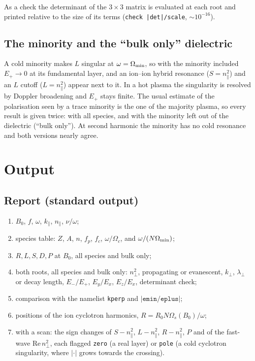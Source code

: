 \documentclass[11pt,a4paper]{article}
\newcommand{\npar}{n_\parallel}
\newcommand{\nperp}{n_\perp}
\newcommand{\code}[1]{\texttt{#1}}
\begin{document}
As a check the determinant of the $3\times3$ matrix is evaluated at each root
and printed relative to the size of its terms (\code{check |det|/scale},
$\sim10^{-16}$).

\subsection{The minority and the ``bulk only'' dielectric}\label{sec:minority}

A cold minority makes $L$ singular at $\omega=\Omega_{\rm min}$, so with the
minority included $E_+\to0$ at its fundamental layer, and an ion--ion hybrid
resonance ($S=\npar^2$) and an $L$ cutoff ($L=\npar^2$) appear next to it. In a
hot plasma the singularity is resolved by Doppler broadening and $E_+$ stays
finite. The usual estimate of the polarisation seen by a trace minority is the
one of the majority plasma, so every result is given twice: with all species,
and with the minority left out of the dielectric (``bulk only''). At second
harmonic the minority has no cold resonance and both versions nearly agree.

\section{Output}

\subsection{Report (standard output)}

\begin{enumerate}[nosep]
  \item $B_0$, $f$, $\omega$, $k_\parallel$, $\npar$, $\nu/\omega$;
  \item species table: $Z$, $A$, $n$, $f_p$, $f_c$, $\omega/\Omega_c$, and
        $\omega/(N\Omega_{\rm min})$;
  \item $R, L, S, D, P$ at $B_0$, all species and bulk only;
  \item both roots, all species and bulk only: $\nperp^2$, propagating or
        evanescent, $k_\perp$, $\lambda_\perp$ or decay length,
        $E_-/E_+$, $E_y/E_x$, $E_z/E_x$, determinant check;
  \item comparison with the namelist \code{kperp} and $|\code{emin}/\code{eplus}|$;
  \item positions of the ion cyclotron harmonics, $R = R_0 N\Omega_s(B_0)/\omega$;
  \item with a scan: the sign changes of $S-\npar^2$, $L-\npar^2$, $R-\npar^2$,
        $P$ and of the fast-wave $\mathrm{Re}\,\nperp^2$, each flagged
        \code{zero} (a real layer) or \code{pole} (a cold cyclotron
        singularity, where $|{\cdot}|$ grows towards the crossing).
\end{enumerate}
\end{document}
